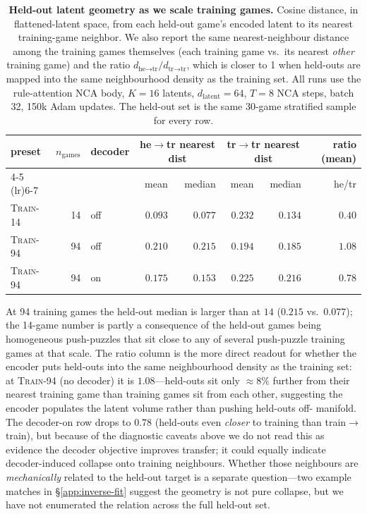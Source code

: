 \begin{table}[t]
  \centering
  \caption{\textbf{Held-out latent geometry as we scale training
    games.} Cosine distance, in flattened-latent space, from each
    held-out game's encoded latent to its nearest training-game
    neighbor. We also report the same nearest-neighbour distance
    among the training games themselves (each training game vs.\
    its nearest \emph{other} training game) and the ratio
    $d_{\text{he}\rightarrow\text{tr}} / d_{\text{tr}\rightarrow\text{tr}}$,
    which is closer to 1 when held-outs are mapped into the same
    neighbourhood density as the training set. All runs use the
    rule-attention NCA body, $K{=}16$ latents, $d_{\text{latent}}{=}64$,
    $T{=}8$ NCA steps, batch 32, 150k Adam updates. The held-out
    set is the same 30-game stratified sample for every row.}
  \label{tab:scaling-curve}
  \small
  \begin{tabular}{l r l r r r r r}
    \toprule
    preset & $n_{\text{games}}$ & decoder
      & \multicolumn{2}{c}{he$\rightarrow$tr nearest dist}
      & \multicolumn{2}{c}{tr$\rightarrow$tr nearest dist}
      & ratio (mean) \\
    \cmidrule(lr){4-5} \cmidrule(lr){6-7}
      &  &  & mean & median & mean & median
      & he/tr \\
    \midrule
    \textsc{Train-14}             & 14 & off & $0.093$ & $0.077$ & $0.232$ & $0.134$ & $0.40$ \\
    \textsc{Train-94}             & 94 & off & $0.210$ & $0.215$ & $0.194$ & $0.185$ & $1.08$ \\
    \textsc{Train-94}             & 94 & on  & $0.175$ & $\mathbf{0.153}$ & $0.225$ & $0.216$ & $\mathbf{0.78}$ \\
    \bottomrule
  \end{tabular}
\end{table}

At 94 training games the held-out median is larger than at $14$
($0.215$ vs.\ $0.077$); the 14-game number is partly a consequence
of the held-out games being homogeneous push-puzzles that sit close
to any of several push-puzzle training games at that scale. The
ratio column is the more direct readout for whether the encoder
puts held-outs into the same neighbourhood density as the training
set: at \textsc{Train-94} (no decoder) it is $1.08$---held-outs
sit only $\approx 8\%$ further from their nearest training game
than training games sit from each other, suggesting the encoder
populates the latent volume rather than pushing held-outs off-
manifold. The decoder-on row drops to $0.78$ (held-outs even
\emph{closer} to training than train$\rightarrow$train), but
because of the diagnostic caveats above we do not read this as
evidence the decoder objective improves transfer; it could equally
indicate decoder-induced collapse onto training neighbours. Whether
those neighbours are \emph{mechanically} related to the held-out
target is a separate question---two example matches in
\S\ref{app:inverse-fit} suggest the geometry is not pure
collapse, but we have not enumerated the relation across the full
held-out set.

